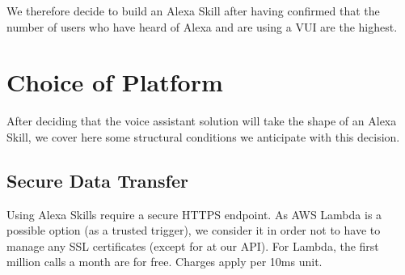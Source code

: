 We therefore decide to build an Alexa Skill after having confirmed that the number of users who have heard of Alexa and are using a VUI are the highest.




%


%
%	
%






%
%
%
%	

\section{Choice of Platform} %
\label{choiceOfPlatform}

After deciding that the voice assistant solution will take the shape of an Alexa Skill, we cover here some structural conditions we anticipate with this decision.

	\subsection*{Secure Data Transfer}
	Using Alexa Skills require a secure HTTPS endpoint. As AWS Lambda is a possible option (as a trusted trigger), we consider it in order not to have to manage any SSL certificates (except for at our API). For Lambda, the first million calls a month are for free. Charges apply per 10ms unit.
	
